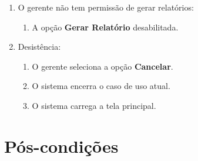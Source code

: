 \begin{enumerate}
	\item O gerente não tem permissão de gerar relatórios:
	\begin{enumerate}
		\item A opção \textbf{Gerar Relatório} desabilitada.
	\end{enumerate}	
	\item Desistência:
	\begin{enumerate}
		\item O gerente seleciona a opção \textbf{Cancelar}.
		\item O sistema encerra o caso de uso atual.
		\item O sistema carrega a tela principal.
	\end{enumerate}
\end{enumerate}



\section{Pós-condições}


